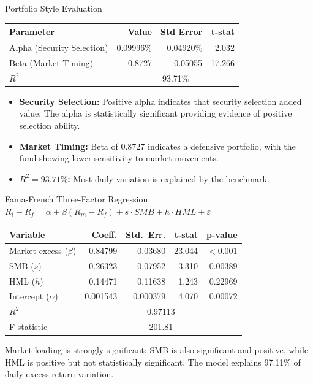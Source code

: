 \documentclass[11pt, aspectratio=43]{beamer}
\begin{document}
\begin{frame}{Portfolio Style Evaluation}
\centering
\small
\begin{tabular}{l r r r}
\toprule
\textbf{Parameter} & \textbf{Value} & \textbf{Std Error} & \textbf{t-stat} \\
\midrule
Alpha (Security Selection) & 0.09996\% & 0.04920\% & 2.032 \\
Beta (Market Timing) & 0.8727 & 0.05055 & 17.266 \\
$R^2$ & \multicolumn{3}{c}{93.71\%} \\
\bottomrule
\end{tabular}

\vspace{0.8em}
\begin{itemize}
    \small
    \item \textbf{Security Selection:} Positive alpha indicates that security selection added value. The alpha is statistically significant providing evidence of positive selection ability.
    \item \textbf{Market Timing:} Beta of 0.8727 indicates a defensive portfolio, with the fund showing lower sensitivity to market movements.
    \item \textbf{$R^2 = 93.71\%$:} Most daily variation is explained by the benchmark.
\end{itemize}
\end{frame}

\begin{frame}{Fama-French Three-Factor Regression}
\centering
\small
$R_i - R_f = \alpha + \beta(R_m - R_f) + s \cdot SMB + h \cdot HML + \varepsilon$

\vspace{0.5em}

\begin{tabular}{l r r r r}
\toprule
\textbf{Variable} & \textbf{Coeff.} & \textbf{Std.\ Err.} & \textbf{t-stat} & \textbf{p-value} \\
\midrule
Market excess ($\beta$) & 0.84799 & 0.03680 & 23.044 & $<0.001$ \\
SMB ($s$) & 0.26323 & 0.07952 & 3.310 & 0.00389 \\
HML ($h$) & 0.14471 & 0.11638 & 1.243 & 0.22969 \\
Intercept ($\alpha$) & 0.001543 & 0.000379 & 4.070 & 0.00072 \\
\midrule
$R^2$ & \multicolumn{4}{c}{0.97113} \\
F-statistic & \multicolumn{4}{c}{201.81} \\
\bottomrule
\end{tabular}

\vspace{0.5em}
\footnotesize
Market loading is strongly significant; SMB is also significant and positive, while HML is positive but not statistically significant. The model explains 97.11\% of daily excess-return variation.
\end{frame}
\end{document}
